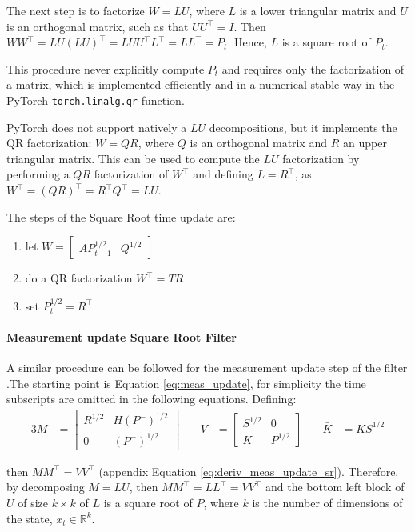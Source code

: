 \documentclass{article}
\begin{document}
The next step is to factorize  $W=LU$, where $L$ is a lower triangular matrix and $U$ is an orthogonal matrix, such as that $UU^\top = I$. Then $WW^\top = LU(LU)^\top = LUU^\top L^\top = LL^\top=P_t$. Hence, $L$ is a square root of $P_t$.

This procedure never explicitly compute $P_t$ and requires only the factorization of a matrix, which is implemented efficiently and in a numerical stable way in the \textsf{PyTorch} \verb|torch.linalg.qr| function. 

PyTorch does not support natively a $LU$ decompositions, but it implements the QR factorization: $W=QR$, where $Q$ is an orthogonal matrix and $R$ an upper triangular matrix. This can be used to compute the $LU$ factorization by performing a $QR$ factorization of $W^\top$ and defining $L = R^\top$, as $W^\top=(QR)^\top=R^\top Q^\top=LU$.

The steps of the Square Root time update are:

\begin{enumerate}
    \item let  $W = \begin{bmatrix}AP_{t-1}^{1/2} & Q^{1/2}\end{bmatrix}$
    \item do a QR factorization $W^\top=TR$
    \item set $P_t^{1/2} = R^\top$
\end{enumerate}

\paragraph{Measurement update Square Root Filter} A similar procedure can be followed for the measurement update step of the filter \cite{dan_simon_optimal_2006}.The starting point is Equation \ref{eq:meas_update}, for simplicity the time subscripts are omitted in the following equations. Defining:
\begin{alignat*}{3}
    M &= \begin{bmatrix} R^{1/2} & H(P^-)^{1/2} \\ 0 & (P^-)^{1/2} \end{bmatrix} \quad &
    V &= \begin{bmatrix} S^{1/2} & 0 \\ \bar{K} & P^{1/2} \end{bmatrix} \quad&
    \bar{K} &= KS^{1/2}
\end{alignat*}
    
then $MM^\top = VV^\top$ (appendix Equation \ref{eq:deriv_meas_update_sr}). Therefore, by decomposing $M=LU$, then $MM^\top=LL^\top=VV^\top$ and the bottom left block of $U$ of size $k \times k$ of $L$ is a square root of $P$, where $k$ is the number of dimensions of the state, $x_t \in \mathbb{R}^k$.
\end{document}
